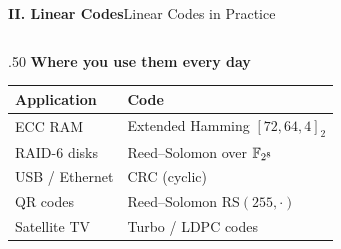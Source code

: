 \begin{frame}{\textbf{II. Linear Codes}}{Linear Codes in Practice}
\small
\begin{columns}[T,onlytextwidth]
  \begin{column}{.50\textwidth}
    \textcolor{TealDarkCyan}{\textbf{Where you use them every day}}

    \medskip
    \begin{tabular}{p{2.0cm}|p{3.2cm}}
      \textbf{Application} & \textbf{Code} \\\hline
      \rowcolor{TealDarkCyan!8}
      ECC RAM & Extended Hamming $[72,64,4]_2$ \\
      RAID-6 disks & Reed--Solomon over $\mathbb{F}_{2^8}$ \\
      \rowcolor{TealDarkCyan!8}
      USB / Ethernet & CRC (cyclic) \\
      QR codes & Reed--Solomon RS$(255,\cdot)$ \\
      \rowcolor{TealDarkCyan!8}
      Satellite TV & Turbo / LDPC codes \\
    \end{tabular}


\end{column}
\end{columns}
\end{frame}
